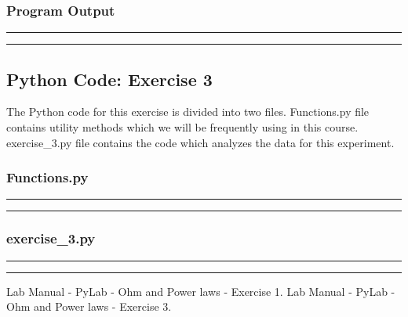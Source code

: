 \documentclass[letterpaper,12pt]{article}
\begin{document}
\pagebreak
\subsubsection{Program Output}
\noindent\rule{\textwidth}{1pt}

\noindent\rule{\textwidth}{1pt}

\pagebreak

\subsection{Python Code: Exercise 3}

The Python code for this exercise is divided into two files. Functions.py file contains utility methods
which we will be frequently using in this course. exercise\_3.py file contains the code which analyzes
the data for this experiment.

\subsubsection{Functions.py}

\noindent\rule{\textwidth}{1pt}

\noindent\rule{\textwidth}{1pt}

\pagebreak

\subsubsection{exercise\_3.py}
\noindent\rule{\textwidth}{1pt}

\noindent\rule{\textwidth}{1pt}
\pagebreak

\begin{thebibliography}{99}

 Lab Manual - PyLab - Ohm and Power laws - Exercise 1.
 Lab Manual - PyLab - Ohm and Power laws - Exercise 3.

\end{thebibliography}
\end{document}
